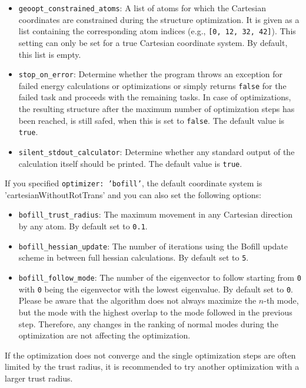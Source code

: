 \documentclass[]{tufte-book}
\begin{document}
\begin{itemize}
\item \texttt{geoopt\_constrained\_atoms}: A list of atoms for which the Cartesian coordinates are constrained during the structure optimization.
  It is given as a list containing the corresponding atom indices (e.g., \texttt{[0, 12, 32, 42]}). This setting can only be set for a true Cartesian coordinate system.
By default, this list is empty.
\item \texttt{stop\_on\_error}: Determine whether the program throws an exception for failed energy calculations or optimizations or simply returns \texttt{false} for the failed task and proceeds with the remaining tasks. In case of optimizations, the resulting structure after the maximum number of optimization steps has been reached, is still safed, when this is set to \texttt{false}. The default value is \texttt{true}.
\item \texttt{silent\_stdout\_calculator}: Determine whether any standard output of the calculation itself should be printed. The default value is \texttt{true}.
\end{itemize}

If you specified \texttt{optimizer: 'bofill'}, the default coordinate system is 'cartesianWithoutRotTrans'
and you can also set the following options:
\begin{itemize}
\item \texttt{bofill\_trust\_radius}: The maximum movement in any Cartesian direction by any atom. By default set to \texttt{0.1}.
\item \texttt{bofill\_hessian\_update}: The number of iterations using the Bofill update scheme in between full hessian calculations.
By default set to \texttt{5}.
\item \texttt{bofill\_follow\_mode}: The number of the eigenvector to follow starting from \texttt{0} with \texttt{0} being the eigenvector with the lowest eigenvalue. By default set to \texttt{0}. Please be aware that the algorithm does not always maximize the $n$-th mode, but the mode with the highest overlap to the mode followed in the previous step. Therefore, any changes in the ranking of normal modes during the optimization are not affecting the optimization.
\end{itemize}
If the optimization does not converge and the single optimization steps are often limited by the trust radius, it is recommended to try another optimization with a larger trust radius.
\end{document}
